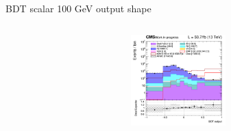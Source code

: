 \documentclass[8pt]{beamer}
\begin{document}
\begin{frame}{BDT scalar 100 GeV output shape}
\begin{columns}
		\begin{column}{0.33\textwidth}
			\begin{center}
			\begin{block}{}\end{block}	
     			\includegraphics[width=1.0\textwidth, height=100pt]{figs/2018/SmearSR-ttDM-scalar100/log_cratio_topCR_ll_ST_BDT_output_scalar100_customBinsAttempt7.png}
    		\end{center}		
		\end{column}
\end{columns}


\end{frame}
\end{document}
